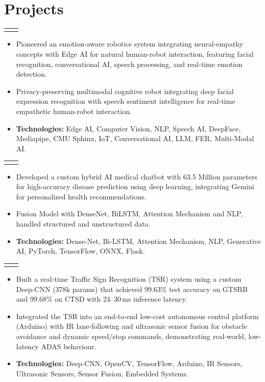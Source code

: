 \documentclass[letterpaper,10pt]{article}
\makeatletter
\renewcommand{\small}{\fontsize{9}{11}\selectfont}
\newcommand{\ProjEntry}[2]{%
  \begin{tabularx}{\linewidth}{@{}>{\RaggedRight\arraybackslash}X@{\hspace{0.6em}}r@{}}
    {\bfseries\color{NavyBlue}#1} & {\small\itshape\color{SubtleGrey}#2}
  \end{tabularx}\par\vspace{2pt}%
}
\newcommand{\Point}[1]{\item \small\RaggedRight #1}
\makeatother
\begin{document}
\section{Projects}

\ProjEntry{Project ORION -- Optimised Robotic Intelligence for Operative Neural-empathy}{}
\begin{itemize}
  \Point{Pioneered an emotion-aware robotics system integrating neural-empathy concepts with Edge AI for natural human-robot interaction, featuring facial recognition, conversational AI, speech processing, and real-time emotion detection.}
  \Point{Privacy-preserving multimodal cognitive robot integrating deep facial expression recognition with speech sentiment intelligence for real-time empathetic human-robot interaction.}
  \Point{\textbf{Technologies:} Edge AI, Computer Vision, NLP, Speech AI, DeepFace, Mediapipe, CMU Sphinx, IoT, Conversational AI, LLM, FER, Multi-Modal AI.}
\end{itemize}
\vspace{5pt}

\ProjEntry{AyuSeva -- AI Medical Chatbot for Disease Prediction}{}
\begin{itemize}
  \Point{Developed a custom hybrid AI medical chatbot with 63.5 Million parameters for high-accuracy disease prediction using deep learning, integrating Gemini for personalized health recommendations.}
  \Point{Fusion Model with DenseNet, BiLSTM, Attention Mechanism and NLP, handled structured and unstructured data.}
  \Point{\textbf{Technologies:} Dense-Net, Bi-LSTM, Attention Mechanism, NLP, Generative AI, PyTorch, TensorFlow, ONNX, Flask.}
\end{itemize}
\vspace{5pt}

\ProjEntry{Autonomous Car}{}
\begin{itemize}
  \Point{Built a real-time Traffic Sign Recognition (TSR) system using a custom Deep-CNN (378k params) that achieved 99.63\% test accuracy on GTSRB and 99.68\% on CTSD with 24--30\,ms inference latency.}
  \Point{Integrated the TSR into an end-to-end low-cost autonomous control platform (Arduino) with IR lane-following and ultrasonic sensor fusion for obstacle avoidance and dynamic speed/stop commands, demonstrating real-world, low-latency ADAS behaviour.}
  \Point{\textbf{Technologies:} Deep-CNN, OpenCV, TensorFlow, Arduino, IR Sensors, Ultrasonic Sensors, Sensor Fusion, Embedded Systems.}
\end{itemize}
\vspace{5pt}
\end{document}
